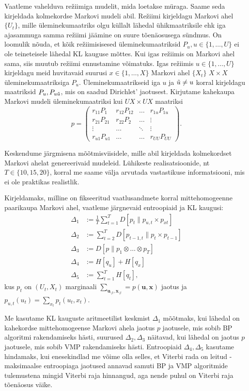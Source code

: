 Vaatleme vahelduva režiimiga mudelit, mida loetakse müraga. Saame seda kirjeldada kolmekordse Markovi mudeli abil. Režiimi kirjeldagu Markovi ahel $\{U_t\}$, mille üleminekumaatriks olgu küllalt lähedal ühikmaatriksile ehk iga ajasammuga samma režiimi jäämine on suure tõenäosusega sündmus. On loomulik nõuda, et kõik režiimisisesed üleminekumaatriksid $P_u, u \in \{1,\ldots,U\}$ ei ole teineteisele lähedal KL kauguse mõttes. Kui igas režiimis on Markovi ahel sama, siis muutub režiimi ennustamine võimatuks. Igas režiimis $u \in \{1,\ldots,U\}$ kirjeldagu meid huvitavaid suurusi $x \in \{1,\ldots,X\}$ Markovi ahel $\{X_t\}$ $X \times X$ üleminekumaatriksiga $P_u$. Üleminekumaatrikseid iga $u$ ja $\Tilde{u} \ne u$ korral kirjeldagu maatriksid $P_u, P_{u \Tilde{u}}$, mis on saadud Dirichlet' jaotusest. Kirjutame kahekaupa Markovi mudeli üleminekumaatriksi kui $UX \times UX$ maatriksi
$$p =\begin{pmatrix} 
r_{11} P_1 & r_{12}P_{12} & \dots & r_{1u}P_{1u} \\
r_{21}P_{21} & r_{22}P_2 & \ldots & \vdots \\
\vdots & \dots & \ddots & \vdots \\
r_{u1}P_{u1} & \dots & \dots & r_{UU}P_{UU} 
\end{pmatrix}.$$

Keskendume järgmisena mõõtmisviisidele, mille abil kirjeldada kolmekordset Markovi ahelat genereerivaid mudeleid. Lühikeste realisatsioonide, nt $T \in \{ 10, 15, 20 \}$, korral me saame välja arvutada vastastikuse informatsiooni, mis ei ole praktikas realistlik.

Kirjeldamaks, milline on fikseeritud vaatlusandmete korral mittehomogeenne paarikaupa Markovi ahel, vaatleme järgnevaid entroopiaid ja KL kaugusi:
\begin{align*}
    \Delta_1 &:= \frac{1}{T}\sum_{t=1}^TD[p_{t} \| p_{u,t} \times p_{xt}]\\
    \Delta_2 &:= \sum_{t=2}^T D[p_{t-1,t} \| p_{t} \times p_{t-1}]\\
    \Delta_3 &:= D[p\| p_{1} \otimes \ldots \otimes p_{T}]\\
    \Delta_4 &:= H[q_u] + H[q_x]\\
    \Delta_5 &:= \sum_{t=1}^T H[q_t],
\end{align*}
kus $p_t$ on $(U_t,X_t)$ marginaali $\sum_{\bm{u}_{\setminus t}, \bm{x}_{\setminus t}} = p(\bm{u},\bm{x})$ jaotus ja $p_{u,t}(u_t) = \sum_{x_t}p_t(u_t,x_t)$.

Me kasutame KL kauguste aritmeetilist keskmist $\Delta_1$ mõõtmaks, kui lähedal on kahekordse mittehomogeense Markovi ahela jaotus $p$ jaotusele, mis sobib BP algoritmi rakendamiseks hästi, suurused $\Delta_2, \Delta_3$ näitavad, kui lähedal on jaotus $p$ jaotusele, mis sobib VMP rakendamiseks hästi. Entroopiaid $\Delta_4, \Delta_5$ kasutame hindamaks, kui enesekindlad me võime olla selles, et Viterbi rada on leitud - maksimaalse entroopiaga jaotused annavad samuti BP ja VMP algoritmide tulemustena mingid Viterbi raja hinnangud, aga nende puhul on Viterbi raja tõenäosus väike.

